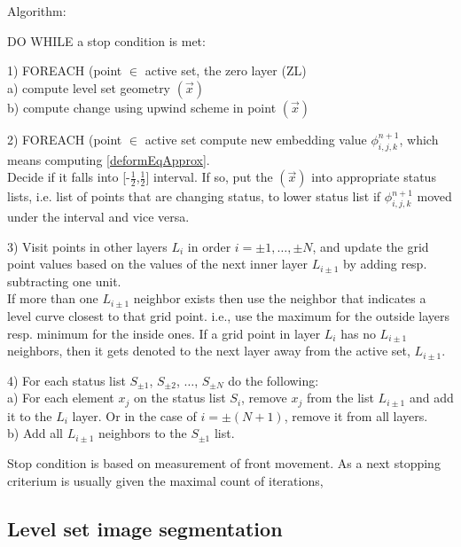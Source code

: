 \par
Algorithm:
\label{alg:sparseFileld}
\par
DO WHILE a stop condition is met:
\par
1) FOREACH (point $\in$ active set, the zero layer (ZL)\\
  a) compute level set geometry $(\vec x)$\\
  b) compute change using upwind scheme in point $(\vec x)$
\par
2) FOREACH (point $\in$ active set compute new embedding value $\phi_{i,j,k}^{n+1}$, which means computing \ref{deformEqApprox}.\\
Decide if it falls into [-$\frac{1}{2}$,$\frac{1}{2}$] interval.
If so, put the $(\vec x)$ into appropriate status lists, i.e. list of points that are changing status, to lower status list if $\phi_{i,j,k}^{n+1}$ moved under the interval and vice versa.
\par
3) Visit points in other layers $L_i$ in order $i=\pm 1,\ldots, \pm N$, and update the grid point values based on the values of the next inner layer $L_{i\pm1}$ by adding resp. subtracting one unit.\\
If more than one $L_{i\pm1}$ neighbor exists then use the neighbor that indicates a level curve closest to that grid point. i.e., use the maximum for the outside layers resp. minimum for the inside ones.
If a grid point in layer $L_i$ has no $L_{i\pm1}$ neighbors, then it gets denoted to the next layer away from the active set, $L_{i\pm1}$.
\par
4) For each status list $S_{\pm1}$, $S_{\pm2}$, $\ldots$, $S_{\pm N}$ do the following:\\
  a) For each element $x_j$ on the status list $S_i$, remove $x_j$ from the list $L_{i\pm1}$ and add it to the $L_{i}$ layer.
Or in the case of $i=\pm (N + 1)$, remove it from all layers.\\
  b) Add all $L_{i\pm1}$ neighbors to the $S_{\pm1}$ list.

\par
Stop condition is based on measurement of front movement.
As a next stopping criterium is usually given the maximal count of iterations,

\subsection{Level set image segmentation}


